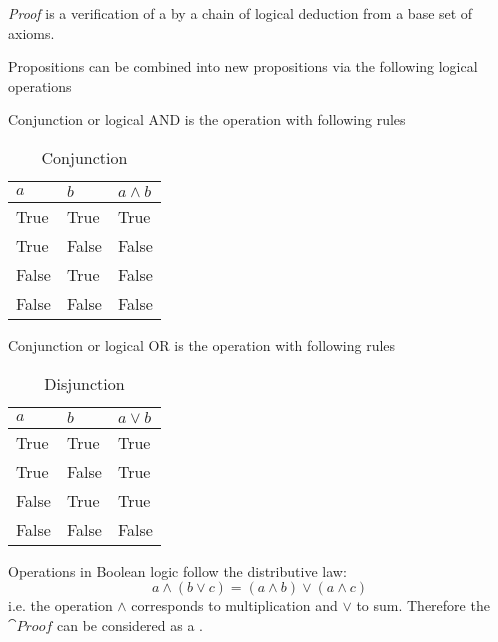 \begin{definition}[Proof]
\label{def:proof}
\textit{Proof} is a verification \cite{bib:whatisaproof} of a
 by a chain of logical deduction from a
base set of axioms.
\end{definition}

Propositions can be combined into new propositions via the following
logical operations
\begin{definition}[Conjunction]
\label{def:conjunction}
Conjunction or logical AND is the operation with following rules
  \begin{table}[H]
    \centering
    \caption{Conjunction}
    \label{tab:conjunction}
      \begin{tabular}{|l|l|l|}
        \hline
        $a$ & $b$ & $a \land b$ \\ \hline
        True & True & True \\ \hline
        True & False & False \\ \hline
        False & True & False \\ \hline
        False & False & False \\ \hline
      \end{tabular}
  \end{table}
\end{definition}
\begin{definition}[Disjunction]
\label{def:disjunction}
Conjunction or logical OR is the operation with following rules
  \begin{table}[H]
    \centering
    \caption{Disjunction}
    \label{tab:disjunction}
      \begin{tabular}{|l|l|l|}
        \hline
        $a$ & $b$ & $a \lor b$ \\ \hline
        True & True & True \\ \hline
        True & False & True \\ \hline
        False & True & True \\ \hline
        False & False & False \\ \hline
      \end{tabular}
  \end{table}
\end{definition}

Operations in Boolean logic follow the distributive law:
\begin{equation}
a \land ( b \lor c) = (a \land b) \lor (a \land c) 
\label{eq:distributive_law_boolean}
\end{equation}
i.e. the operation $\land$ corresponds to multiplication and $\lor$ to
sum. Therefore the $\cat{Proof}$ can be considered as a
. 


